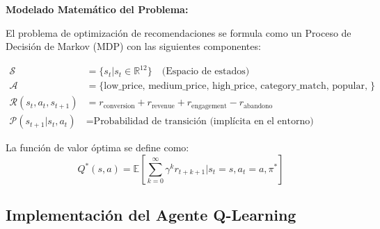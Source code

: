 \textbf{Modelado Matemático del Problema:}

El problema de optimización de recomendaciones se formula como un Proceso de Decisión de Markov (MDP) con las siguientes componentes:

\begin{align}
\mathcal{S} &= \{s_t | s_t \in \mathbb{R}^{12}\} \quad \text{(Espacio de estados)} \\
\mathcal{A} &= \{\text{low\_price, medium\_price, high\_price, category\_match, popular, personalized}\} \\
\mathcal{R}(s_t, a_t, s_{t+1}) &= r_{\text{conversion}} + r_{\text{revenue}} + r_{\text{engagement}} - r_{\text{abandono}} \\
\mathcal{P}(s_{t+1}|s_t, a_t) &= \text{Probabilidad de transición (implícita en el entorno)}
\end{align}

La función de valor óptima se define como:
\begin{equation}
Q^*(s, a) = \mathbb{E}\left[\sum_{k=0}^{\infty} \gamma^k r_{t+k+1} \Big| s_t = s, a_t = a, \pi^*\right]
\end{equation}

\subsection{Implementación del Agente Q-Learning}
\label{subsec:implementacion_ql}

